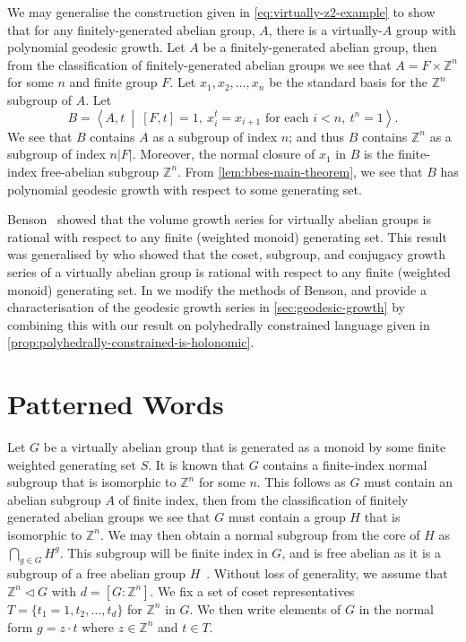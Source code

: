 We may generalise the construction given in \cref{eq:virtually-z2-example} to show that for any finitely-generated abelian group, $A$, there is a virtually-$A$ group with polynomial geodesic growth.
Let $A$ be a finitely-generated abelian group, then from the classification of finitely-generated abelian groups we see that $A = F \times \mathbb{Z}^n$ for some $n$ and finite group $F$.
Let $x_1,x_2,\ldots,x_n$ be the standard basis for the $\mathbb{Z}^n$ subgroup of $A$.
Let
\begin{equation}\label{eq:virt-abel-polynomial}
	B
	=
	\left\langle
		A, t
	\ \middle\vert\ 
		[F,t]=1,\ 
		x_i^t = x_{i+1}\text{ for each }i < n,\ 
		t^n = 1
	\right\rangle.
\end{equation}
We see that $B$ contains $A$ as a subgroup of index $n$; and thus $B$ contains $\mathbb{Z}^n$ as a subgroup of index $n |F|$.
Moreover, the normal closure of $x_1$ in $B$ is the finite-index free-abelian subgroup $\mathbb{Z}^n$.
From \cref{lem:bbes-main-theorem}, we see that $B$ has polynomial geodesic growth with respect to some generating set.

Benson~\cites{benson1983} showed that the volume growth series for virtually abelian groups is rational with respect to any finite (weighted monoid) generating set.
This result was generalised by \textcite{evetts2019} who showed that the coset, subgroup, and conjugacy growth series of a virtually abelian group is rational with respect to any finite (weighted monoid) generating set.
In  %
we modify the methods of Benson, and provide a characterisation of the geodesic growth series in \cref{sec:geodesic-growth} by combining this with our result on polyhedrally constrained language given in \cref{prop:polyhedrally-constrained-is-holonomic}.

\section{Patterned Words}\label{sec:patterned-words}

Let $G$ be a virtually abelian group that is generated as a monoid by some finite weighted generating set $S$.
It is known that $G$ contains a finite-index normal subgroup that is isomorphic to $\mathbb{Z}^n$ for some $n$.
This follows as $G$ must contain an abelian subgroup $A$ of finite index, then from the classification of finitely generated abelian groups we see that $G$ must contain a group $H$ that is isomorphic to $\mathbb{Z}^n$.
We may then obtain a normal subgroup from the core of $H$ as $\bigcap_{g\in G} H^g$.
This subgroup will be finite index in $G$, and is free abelian as it is a subgroup of a free abelian group $H$~\cite[100-1]{robinson1996}.
Without loss of generality, we assume that $\mathbb{Z}^n \triangleleft G$ with $d = [G:\mathbb{Z}^n]$.
We fix a set of coset representatives $T = \{t_1=1,t_2,\ldots,t_d\}$ for $\mathbb{Z}^n$ in $G$.
We then write elements of $G$ in the normal form $g = z \cdot t$ where $z \in \mathbb{Z}^n$ and $t \in T$.

